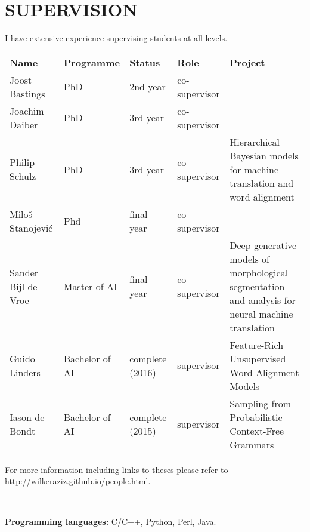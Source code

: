 

\section*{SUPERVISION}

I have extensive experience supervising students at all levels. 

\begin{tabular}{l l l l p{6cm}}
\bf Name & \bf Programme & \bf Status & \bf Role & \bf Project \\
Joost Bastings & PhD & 2nd year & co-supervisor & \\
Joachim Daiber & PhD & 3rd year & co-supervisor & \\
Philip Schulz  & PhD & 3rd year & co-supervisor & Hierarchical Bayesian models for machine translation and word alignment \\
Milo\v{s} Stanojevi\'c & Phd & final year & co-supervisor & \\
Sander Bijl de Vroe & Master of AI & final year & co-supervisor & Deep generative models of morphological segmentation and analysis for neural machine translation\\
Guido Linders & Bachelor of AI & complete (2016) & supervisor & Feature-Rich Unsupervised Word Alignment Models \\
Iason de Bondt & Bachelor of AI & complete (2015) & supervisor & Sampling from Probabilistic Context-Free Grammars\\
\end{tabular}
For more information including links to theses please refer to \url{http://wilkeraziz.github.io/people.html}.


~

{\bf Programming languages:} C/C++, Python, Perl, Java.

~

